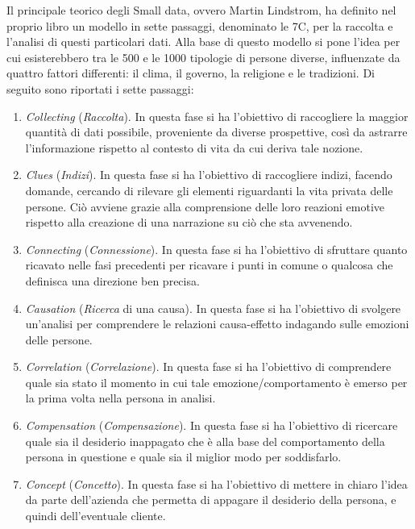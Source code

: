 Il principale teorico degli Small data, ovvero Martin Lindstrom, ha definito nel proprio libro\cite{lindstrom_small_data} un modello in sette passaggi, denominato le 7C, per la raccolta e l’analisi di questi particolari dati. Alla base di questo modello si pone l’idea per cui esisterebbero tra le 500 e le 1000 tipologie di persone diverse, influenzate da quattro fattori differenti: il clima, il governo, la religione e le tradizioni. Di seguito sono riportati i sette passaggi:
\begin{enumerate}
    \item \textit{Collecting} (\textit{Raccolta}). In questa fase si ha l’obiettivo di raccogliere la maggior quantità di dati possibile, proveniente da diverse prospettive, così da astrarre l’informazione rispetto al contesto di vita da cui deriva tale nozione.
    \item \textit{Clues} (\textit{Indizi}). In questa fase si ha l’obiettivo di raccogliere indizi, facendo domande, cercando di rilevare gli elementi riguardanti la vita privata delle persone. Ciò avviene grazie alla comprensione delle loro reazioni emotive rispetto alla creazione di una narrazione su ciò che sta avvenendo.
    \item \textit{Connecting} (\textit{Connessione}). In questa fase si ha l’obiettivo di sfruttare quanto ricavato nelle fasi precedenti per ricavare i punti in comune o qualcosa che definisca una direzione ben precisa.
    \item \textit{Causation} (\textit{Ricerca} di una causa). In questa fase si ha l’obiettivo di svolgere un’analisi per comprendere le relazioni causa-effetto indagando sulle emozioni delle persone.
    \item \textit{Correlation} (\textit{Correlazione}). In questa fase si ha l’obiettivo di comprendere quale sia stato il momento in cui tale emozione/comportamento è emerso per la prima volta nella persona in analisi.
    \item \textit{Compensation} (\textit{Compensazione}). In questa fase si ha l’obiettivo di ricercare quale sia il desiderio inappagato che è alla base del comportamento della persona in questione e quale sia il miglior modo per soddisfarlo.
    \item \textit{Concept} (\textit{Concetto}). In questa fase si ha l’obiettivo di mettere in chiaro l’idea da parte dell’azienda che permetta di appagare il desiderio della persona, e quindi dell’eventuale cliente.
\end{enumerate}

